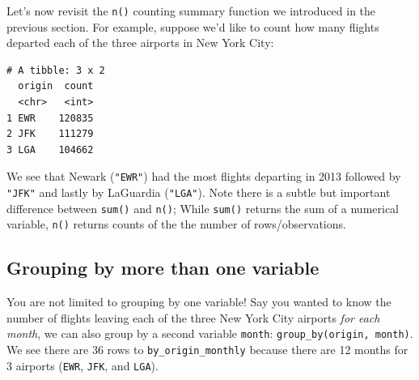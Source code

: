 \documentclass[12pt, krantz2,]{krantz}
\makeatletter
\newenvironment{Shaded}{\begin{snugshade}}{\end{snugshade}}
\newcommand{\DataTypeTok}[1]{\textcolor[rgb]{0.27,0.27,0.27}{#1}}
\newcommand{\KeywordTok}[1]{\textcolor[rgb]{0.27,0.27,0.27}{\textbf{#1}}}
\newcommand{\NormalTok}[1]{#1}
\newcommand{\OperatorTok}[1]{\textcolor[rgb]{0.43,0.43,0.43}{\textbf{#1}}}
\newcommand{\StringTok}[1]{\textcolor[rgb]{0.5,0.5,0.5}{#1}}
\newenvironment{kframe}{%
\medskip{}
\setlength{\fboxsep}{.8em}
 \def\at@end@of@kframe{}%
 \ifinner\ifhmode%
  \def\at@end@of@kframe{\end{minipage}}%
  \begin{minipage}{\columnwidth}%
 \fi\fi%
 \def\FrameCommand##1{\hskip\@totalleftmargin \hskip-\fboxsep
 \colorbox{shadecolor}{##1}\hskip-\fboxsep
     \hskip-\linewidth \hskip-\@totalleftmargin \hskip\columnwidth}%
 \MakeFramed {\advance\hsize-\width
   \@totalleftmargin\z@ \linewidth\hsize
   \@setminipage}}%
 {\par\unskip\endMakeFramed%
 \at@end@of@kframe}
\renewenvironment{Shaded}{\begin{kframe}}{\end{kframe}}
\makeatother
\begin{document}
Let's now revisit the \texttt{n()} counting summary function we introduced in the previous section. For example, suppose we'd like to count how many flights departed each of the three airports in New York City:

\begin{Shaded}
\end{Shaded}

\begin{verbatim}
# A tibble: 3 x 2
  origin  count
  <chr>   <int>
1 EWR    120835
2 JFK    111279
3 LGA    104662
\end{verbatim}

We see that Newark (\texttt{"EWR"}) had the most flights departing in 2013 followed by \texttt{"JFK"} and lastly by LaGuardia (\texttt{"LGA"}). Note there is a subtle but important difference between \texttt{sum()} and \texttt{n()}; While \texttt{sum()} returns the sum of a numerical variable, \texttt{n()} returns counts of the the number of rows/observations.

\hypertarget{grouping-by-more-than-one-variable}{%
\subsection{Grouping by more than one variable}\label{grouping-by-more-than-one-variable}}

You are not limited to grouping by one variable! Say you wanted to know the number of flights leaving each of the three New York City airports \emph{for each month}, we can also group by a second variable \texttt{month}: \texttt{group\_by(origin,\ month)}. We see there are 36 rows to \texttt{by\_origin\_monthly} because there are 12 months for 3 airports (\texttt{EWR}, \texttt{JFK}, and \texttt{LGA}).

\begin{Shaded}
\end{Shaded}
\end{document}
